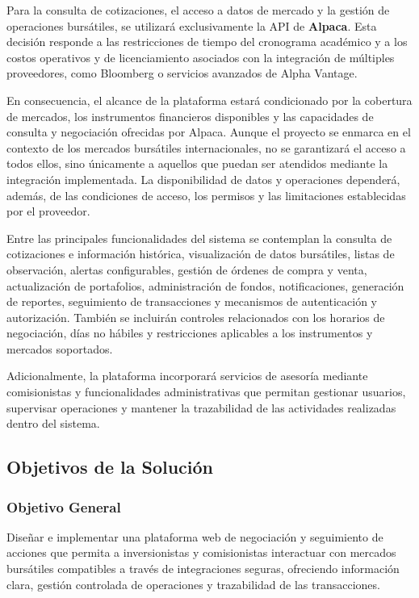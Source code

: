\documentclass[11pt,a4paper,oneside]{article}
\begin{document}
Para la consulta de cotizaciones, el acceso a datos de mercado y la gestión de operaciones bursátiles, se utilizará exclusivamente la API de \textbf{Alpaca}. Esta decisión responde a las restricciones de tiempo del cronograma académico y a los costos operativos y de licenciamiento asociados con la integración de múltiples proveedores, como Bloomberg o servicios avanzados de Alpha Vantage.

En consecuencia, el alcance de la plataforma estará condicionado por la cobertura de mercados, los instrumentos financieros disponibles y las capacidades de consulta y negociación ofrecidas por Alpaca. Aunque el proyecto se enmarca en el contexto de los mercados bursátiles internacionales, no se garantizará el acceso a todos ellos, sino únicamente a aquellos que puedan ser atendidos mediante la integración implementada. La disponibilidad de datos y operaciones dependerá, además, de las condiciones de acceso, los permisos y las limitaciones establecidas por el proveedor.

Entre las principales funcionalidades del sistema se contemplan la consulta de cotizaciones e información histórica, visualización de datos bursátiles, listas de observación, alertas configurables, gestión de órdenes de compra y venta, actualización de portafolios, administración de fondos, notificaciones, generación de reportes, seguimiento de transacciones y mecanismos de autenticación y autorización. También se incluirán controles relacionados con los horarios de negociación, días no hábiles y restricciones aplicables a los instrumentos y mercados soportados.

Adicionalmente, la plataforma incorporará servicios de asesoría mediante comisionistas y funcionalidades administrativas que permitan gestionar usuarios, supervisar operaciones y mantener la trazabilidad de las actividades realizadas dentro del sistema.


\subsection{Objetivos de la Solución}
\subsubsection{Objetivo General}
Diseñar e implementar una plataforma web de negociación y seguimiento de acciones que permita a inversionistas y comisionistas interactuar con mercados bursátiles compatibles a través de integraciones seguras, ofreciendo información clara, gestión controlada de operaciones y trazabilidad de las transacciones.
\end{document}

